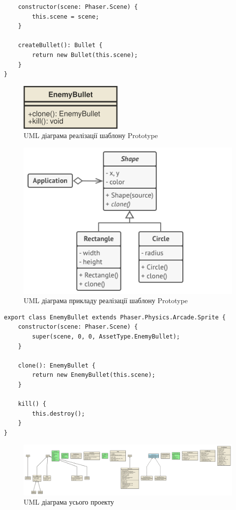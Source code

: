 \documentclass[oneside,14pt]{extarticle}
\begin{document}
\begin{normalsize}
\begin{small}
\begin{lstlisting}
	constructor(scene: Phaser.Scene) {
		this.scene = scene;
	}
	
	createBullet(): Bullet {
		return new Bullet(this.scene);
	}
}
		\end{lstlisting}
	\end{small}
	
	
	\begin{figure}[H]
		\centering
		\includegraphics{prototype}
		\caption{UML діаграма реалізації шаблону Prototype}
	\end{figure}
	
		\begin{figure}[H]
		\centering
		\includegraphics{prototype-ex}
		\caption{UML діаграма прикладу реалізації шаблону Prototype}
	\end{figure}
	
	\begin{small}
		\begin{lstlisting}
export class EnemyBullet extends Phaser.Physics.Arcade.Sprite {
	constructor(scene: Phaser.Scene) {
		super(scene, 0, 0, AssetType.EnemyBullet);
	}
	
	clone(): EnemyBullet {
		return new EnemyBullet(this.scene);
	}
	
	kill() {
		this.destroy();
	}
}
		\end{lstlisting}
	\end{small}
	
	\begin{figure}[H]
		\centering
		\includegraphics[width=\textwidth]{out}
		\caption{UML діаграма усього проекту}
	\end{figure}
	

\end{normalsize}
\end{document}
